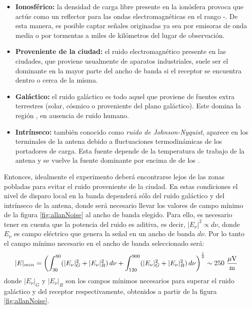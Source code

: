 	\begin{itemize}
	 \item \textbf{Ionosf\'erico:} la densidad de carga libre presente en la ion\'osfera provoca que act\'ue como un reflector para las ondas electromagn\'eticas en el rango -. De esta manera, es posible captar se\~nales originadas ya sea por emisoras de onda media o por tormentas a miles de kil\'ometros del lugar de observaci\'on.
	 \item \textbf{Proveniente de la ciudad:} el ruido electromagn\'etico presente en las ciudades, que proviene usualmente de aparatos industriales, suele ser el dominante en la mayor parte del ancho de banda si el receptor se encuentra dentro o cerca de la misma.
	 \item \textbf{Gal\'actico:} el ruido gal\'actico es todo aquel que proviene de fuentes extra terrestres (solar, c\'osmico o proveniente del plano gal\'actico). Este domina la regi\'on , en ausencia de ruido humano.
	 \item \textbf{Intr\'inseco:} tambi\'en conocido como \emph{ruido de Johnson-Nyquist}, aparece en los terminales de la antena debido a fluctuaciones termodin\'amicas de los portadores de carga. Esta fuente depende de la temperatura de trabajo de la antena y se vuelve la fuente dominante por encima de de los .
	\end{itemize}
	
	Entonces, idealmente el experimento deber\'a encontrarse lejos de las zonas pobladas para evitar el ruido proveniente de la ciudad.
	En estas condiciones el nivel de disparo local en la banda  depender\'a s\'olo del ruido gal\'actico y del intr\'inseco de la antena, donde ser\'a necesario llevar los valores de campo m\'inimo de la figura \ref{fig:allanNoise} al ancho de banda elegido.
	Para ello, es necesario tener en cuenta que la potencia del ruido es aditiva, es decir, $|E_\nu|^2\propto d\nu$, donde $E_\nu$ es campo el\'ectrico que genera la se\~nal en un ancho de banda $d\nu$.
	Por lo tanto el campo m\'inimo necesario en el ancho de banda seleccionado ser\'a:
	\begin{equation}
	|E|_{min}=\left(\int_{30}^{80}(|E_\nu|^2_G+|E_\nu|^2_R)\,d\nu+
	\int_{120}^{900}(|E_\nu|^2_G+|E_\nu|^2_R)\,d\nu
	\right)^\frac{1}{2}
	\sim 250 {\rm\ \dfrac{\mu V}{m}}
	\end{equation}
	donde $|E_\nu|_G$ y $|E_\nu|_R$ son los campos m\'inimos necesarios para superar el ruido gal\'actico y del receptor respectivamente, obtenidos a partir de la figura \ref{fig:allanNoise}.
	
